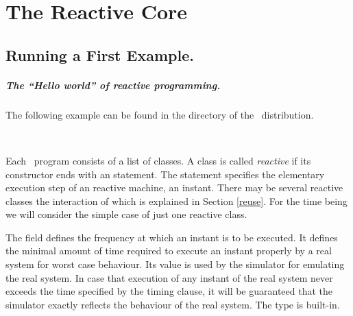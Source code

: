\chapter{The Reactive Core}\label{core}


\section{Running a First Example.} 

\paragraph{The ``Hello world'' of reactive programming.} The following example can be found in the directory  of the \se\ distribution.
% 
\begin{example}[Basic]\label{Basic}\ 
\end{example}

Each \se\ program consists of a list of classes. A class is called \emph{reactive} if its constructor ends with an  statement. The  statement specifies the elementary execution step of an reactive machine, an instant. There may be several reactive classes the interaction of which is explained in Section \ref{reuse}. For the time being we will consider the simple case of just one reactive class.

%


The field  defines the frequency at
which an instant is to be executed. It defines the minimal amount of time
required to execute an instant properly by a real system for worst
case behaviour. Its value is used by the simulator for emulating the real system. In case that execution of any instant of the real system never exceeds the time specified by the timing clause, it will be guaranteed that the simulator exactly reflects the behaviour of the real system. The type  is built-in.

